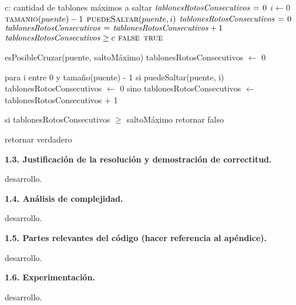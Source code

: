 \vspace*{0.5cm}



\begin{codebox}
\li \Comment c: cantidad de tablones máximos a saltar
\li $\id{tablonesRotosConsecutivos} \gets 0$
\li \For $i \gets 0$ \To $\textnormal{\scshape tamanio}(puente) - 1$
\li     \Do 
            \If $\textnormal{\scshape puedeSaltar}(puente, i)$
\li             \Then
                    $\id{tablonesRotosConsecutivos} \gets 0$
\li         \Else
\li             $\id{tablonesRotosConsecutivos} \gets \id{tablonesRotosConsecutivos} + 1$
            \End
\li         \If $\id{tablonesRotosConsecutivos} \geq c$
\li             \Then
                    \Return $\textnormal{\scshape false}$
            \End
        \End
\li \Return $\textnormal{\scshape true}$   
\end{codebox}



esPosibleCruzar(puente, saltoMáximo)
  tablonesRotosConsecutivos $\gets$ 0

  para i entre 0 y tamaño(puente) - 1
    si puedeSaltar(puente, i)
      tablonesRotosConsecutivos $\gets$ 0
    sino
      tablonesRotosConsecutivos $\gets$ tablonesRotosConsecutivos + 1

    si tablonesRotosConsecutivos $\geq$ saltoMáximo
      retornar falso

  retornar verdadero


\vspace*{0.75cm} \noindent



\noindent
\textbf{1.3. Justificación de la resolución y demostración de correctitud.}

\vspace*{0.3cm}

desarrollo.


\vspace*{0.75cm} \noindent



\noindent
\textbf{1.4. Análisis de complejidad.}

\vspace*{0.3cm}

desarrollo.


\vspace*{0.75cm} \noindent



\noindent
\textbf{1.5. Partes relevantes del código (hacer referencia al apéndice).}

\vspace*{0.3cm}

desarrollo.


\vspace*{0.75cm} \noindent



\noindent
\textbf{1.6. Experimentación.}

\vspace*{0.3cm}

desarrollo.
